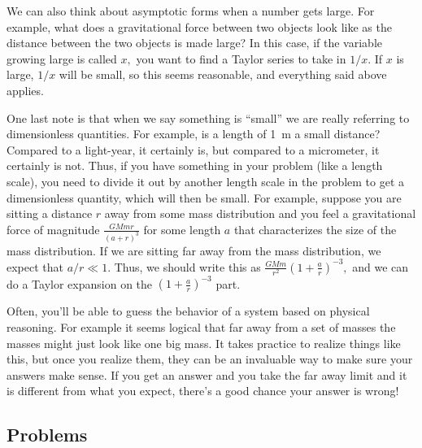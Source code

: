 \documentclass[12pt]{book}
\begin{document}
 We can also think about asymptotic forms when a number gets large. For example, what does a gravitational force between two objects look like as the distance between the two objects is made large? In this case, if the variable growing large is called $x,$ you want to find a Taylor series to take in $1/x.$ If $x$ is large, $1/x$ will be small, so this seems reasonable, and everything said above applies.
 
 One last note is that when we say something is ``small'' we are really referring to dimensionless quantities. For example, is a length of 1~m a small distance? Compared to a light-year, it certainly is, but compared to a micrometer, it certainly is not. Thus, if you have something in your problem (like a length scale), you need to divide it out by another length scale in the problem to get a dimensionless quantity, which will then be small. For example, suppose you are sitting a distance $r$ away from some mass distribution and you feel a gravitational force of magnitude $\frac{GMm r}{(a+r)^3}$ for some length $a$ that characterizes the size of the mass distribution. If we are sitting far away from the mass distribution, we expect that $a/r\ll 1.$ Thus, we should write this as $\frac{GMm}{r^2}(1+\frac{a}{r})^{-3},$ and we can do a Taylor expansion on the $(1+\frac{a}{r})^{-3}$ part.
 
  Often, you'll be able to guess the behavior of a system based on physical reasoning. For example it seems logical that far away from a set of masses the masses might just look like one big mass. It takes practice to realize things like this, but once you realize them, they can be an invaluable way to make sure your answers make sense. If you get an answer and you take the far away limit and it is different from what you expect, there's a good chance your answer is wrong!

  \pagebreak

\subsection{Problems}
\end{document}
